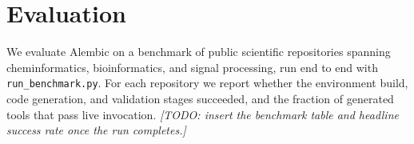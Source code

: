 \section*{Evaluation}
We evaluate Alembic on a benchmark of public scientific repositories spanning cheminformatics, bioinformatics, and signal processing, run end to end with \texttt{run\_benchmark.py}. For each repository we report whether the environment build, code generation, and validation stages succeeded, and the fraction of generated tools that pass live invocation. \textit{[TODO: insert the benchmark table and headline success rate once the run completes.]}
